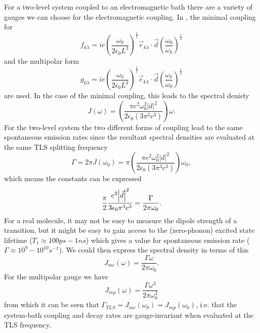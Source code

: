 \documentclass[]{article}
\begin{document}
\begin{itemize}
\begin{itemize}
For a two-level system coupled to an electromagnetic bath there are a variety of gauges we can choose for the electromagnetic coupling. In \cite{Stokes2012}, the minimal coupling for
\begin{equation}
\label{eq:MinimalCouplingConst}
f_{k\lambda} = i e \left(\frac{\omega_0}{2\epsilon_0 L^3}\right)^{\frac{1}{2}} \vec{e}_{k \lambda}\cdot\vec{d} \left(\frac{\omega_0}{\omega_k}\right)^{\frac{1}{2}} 
\end{equation}
and the multipolar form
\begin{equation}
\label{eq:MultipolarCouplingConst}
g_{k\lambda} = i e \left(\frac{\omega_0}{2\epsilon_0 L^3}\right)^{\frac{1}{2}} \vec{e}_{k \lambda}\cdot\vec{d} \left(\frac{\omega_k}{\omega_0}\right)^{\frac{1}{2}} 
\end{equation}
are used. 
In the case of the minimal coupling, this leads to the spectral denisty
\begin{equation}
J(\omega) = \left(\frac{\pi e^2\omega_0^2 |d|^2}{2\epsilon_0(3\pi^3 c^3)}\right)\omega.
\end{equation}
For the two-level system the two different forms of coupling lead to the same spontaneous emission rates since the resultant spectral densities are evaluated at the same TLS splitting frequency
\begin{equation}
\label{eq:TLS_decay}
\Gamma = 2\pi J(\omega_0) = \pi\left(\frac{\pi e^2\omega_0^2 |d|^2}{2\epsilon_0(3\pi^3 c^3)}\right)\omega_0,
\end{equation}
which means the constants can be expressed
\begin{equation}
\frac{\pi}{2} \frac{e^2\abs{\vec{d}}^2}{3\epsilon_0\pi^3c^3} = \frac{\Gamma}{2\pi\omega_0}.
\end{equation}
For a real molecule, it may not be easy to measure the dipole strength of a transition, but it might be easy to gain access to the (zero-phonon) excited state lifetime ($T_1 \approx 100ps - 1ns$) which gives a value for spontaneous emission rate ($\Gamma\approx 10^9-10^{10}s^{-1}$). We could then express the spectral density in terms of this
\begin{equation}
\label{eq:MinimalSpectral}
J_{mc}(\omega) = \frac{\Gamma\omega}{2\pi\omega_0}.
\end{equation}
For the multipolar gauge we have
\begin{equation}
\label{eq:MultipolarSpectral}
J_{mp}(\omega) = \frac{\Gamma\omega^3}{2\pi\omega_0^3}
\end{equation}
from which it can be seen that $\Gamma_{TLS}=J_{mc}(\omega_0)=J_{mp}(\omega_0)$, i.e. that the system-bath coupling and decay rates are gauge-invariant when evaluated at the TLS frequency.


\end{itemize}
\end{itemize}
\end{document}
